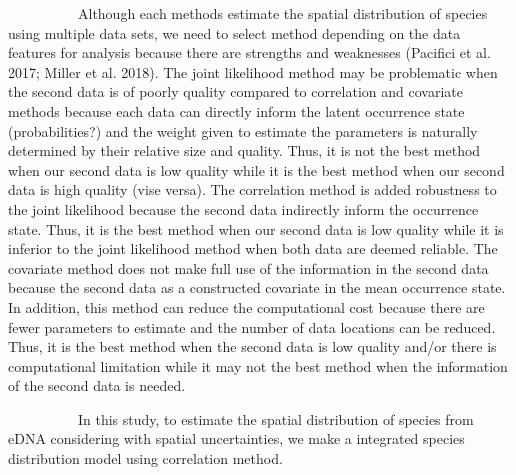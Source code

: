 \documentclass[12pt]{article}
\begin{document}
\begin{linenumbers}
\ \ \ \ \ \ \ \ \ \ 
Although each methods estimate the spatial distribution of species using multiple data sets, we need to select method depending on the data features for analysis because there are strengths and weaknesses (Pacifici et al. 2017; Miller et al. 2018). The joint likelihood method may be problematic when the second data is of poorly quality compared to correlation and covariate methods because each data can directly inform the latent occurrence state (probabilities?) and the weight given to estimate the parameters is naturally determined by their relative size and quality. Thus, it is not the best method when our second data is low quality while it is the best method when our second data is high quality (vise versa). 
The correlation method is added robustness to the joint likelihood because the second data indirectly inform the occurrence state. Thus, it is the best method when our second data is low quality while it is inferior to the joint likelihood method when both data are deemed reliable.
The covariate method does not make full use of the information in the second data because the second data as a constructed covariate in the mean occurrence state. In addition, this method can reduce the computational cost because there are fewer parameters to estimate and the number of data locations can be reduced. Thus, it is the best method when the second data is low quality and/or there is computational limitation while it may not the best method when the information of the second data is needed.



\ \ \ \ \ \ \ \ \ \ 
In this study, to estimate the spatial distribution of species from eDNA considering with spatial uncertainties, we make a integrated species distribution model using correlation method.


\end{linenumbers}
\end{document}
